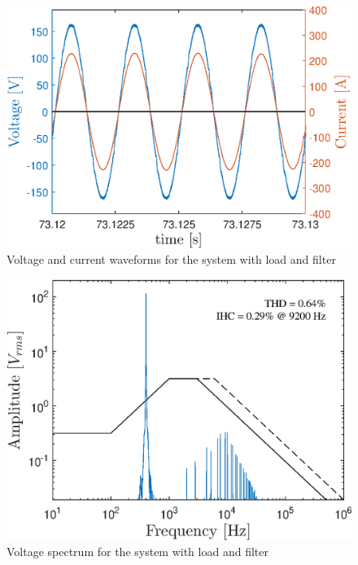\begin{figure}[!h] %
	\centering
	\includegraphics[width=0.27\textheight]{Figures/artigo_filt_3.eps}
	\caption{Voltage and current waveforms for the system with load and filter}
	\label{fig:artigo_filt_3.eps}
\end{figure}

\begin{figure}[!h] %
	\centering
	\includegraphics[width=0.27\textheight]{Figures/artigo_filt_4.eps}
	\caption{Voltage spectrum for the system with load and filter}
	\label{fig:artigo_filt_4.eps}
\end{figure}